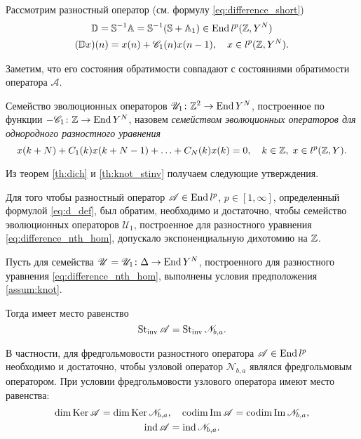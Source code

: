 Рассмотрим разностный оператор (см. формулу \eqref{eq:difference_short})
\begin{gather*}
\mathbb D = \mathbb S^{-1} \mathbb A = \mathbb S^{-1}(\mathbb S + \mathbb A_1) \in \operatorname{End}{l^p(\mathbb{Z}, Y^N)}\\
(\mathbb D x)(n) = x(n) + \mathcal C_1(n) x(n-1), \quad x \in l^p(\mathbb{Z}, Y^N).
\end{gather*}

Заметим, что его состояния обратимости совпадают с состояниями обратимости оператора $\mathcal A$.

\begin{definition}
    Семейство эволюционных операторов $\mathcal U_1 \colon \mathbb{Z}^2 \to \operatorname{End}{Y^N}$, построенное по функции $-\mathcal C_1 \colon \mathbb{Z} \to \operatorname{End}{Y^N}$, назовем \emph{семейством эволюционных операторов для однородного разностного уравнения}
    \begin{equation}\label{eq:difference_nth_hom}
        x(k + N) + C_1(k) x(k + N - 1) + \dotsc + C_{N}(k) x(k) = 0, \quad k \in \mathbb{Z}, \; x \in l^p(\mathbb{Z}, Y).
    \end{equation}
\end{definition}

Из теорем \ref{th:dich} и \ref{th:knot_stinv} получаем следующие утверждения.

\begin{theorem}
    Для того чтобы разностный оператор $\mathcal A\in \operatorname{End}{l^p}$, $p \in [1, \infty]$, определенный формулой \eqref{eq:d_def}, был обратим, необходимо и достаточно, чтобы семейство эволюционных операторов $\mathcal U_1$, построенное для разностного уравнения \eqref{eq:difference_nth_hom}, допускало экспоненциальную дихотомию на $\mathbb{Z}$.
\end{theorem}

\begin{theorem}\label{th:fredholm_difference}
    Пусть для семейства $\mathcal U = \mathcal U_1\colon \Delta \to \operatorname{End} Y^N$, построенного для разностного уравнения \eqref{eq:difference_nth_hom}, выполнены условия предположения \ref{assum:knot}.

    Тогда имеет место равенство
    \[ \operatorname{St_{inv}}{\mathcal A} = \operatorname{St_{inv}}{\mathcal N_{b, a}}.\]

    В частности, для фредгольмовости разностного оператора $\mathcal A\in \operatorname{End}{l^p}$ необходимо и достаточно, чтобы узловой оператор $\mathcal N_{b, a}$ являлся фредгольмовым оператором. При условии фредгольмовости узлового оператора имеют место равенства:
    \begin{gather*}
        \dim \operatorname{Ker} \mathcal A = \dim \operatorname{Ker} \mathcal N_{b, a}, \quad
        \operatorname{codim} \operatorname{Im} \mathcal A = \operatorname{codim} \operatorname{Im} \mathcal N_{b, a}, \\
        \operatorname{ind} \mathcal A = \operatorname{ind} \mathcal N_{b, a}.
    \end{gather*}
\end{theorem}

